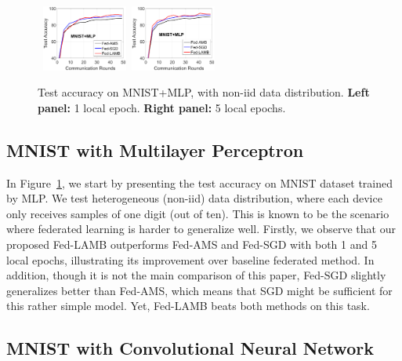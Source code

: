 \documentclass{article}
\begin{document}
\begin{figure}[h]
    \begin{center}
        \mbox{
        \includegraphics[width=0.25\textwidth]{figure/mnist_testerror_mlp_ep1_client50_iid0.eps}
        \includegraphics[width=0.25\textwidth]{figure/mnist_testerror_mlp_ep5_client50_iid0.eps}
        }
    \end{center}
	\caption{Test accuracy on MNIST+MLP, with non-iid data distribution. \textbf{Left panel:} 1 local epoch. \textbf{Right panel:} 5 local epochs.}
	\label{fig:mnist-mlp-noniid}
\end{figure}

\subsection{MNIST with Multilayer Perceptron}

In Figure~\ref{fig:mnist-mlp-noniid}, we start by presenting the test accuracy on MNIST dataset trained by MLP. We test heterogeneous (non-iid) data distribution, where each device only receives samples of one digit (out of ten). This is known to be the scenario where federated learning is harder to generalize well. Firstly, we observe that our proposed Fed-LAMB outperforms Fed-AMS and Fed-SGD with both 1 and 5 local epochs, illustrating its improvement over baseline federated method. In addition, though it is not the main comparison of this paper, Fed-SGD slightly generalizes better than Fed-AMS, which means that SGD might be sufficient for this rather simple model. Yet, Fed-LAMB beats both methods on this task.


\subsection{MNIST with Convolutional Neural Network}
\end{document}
